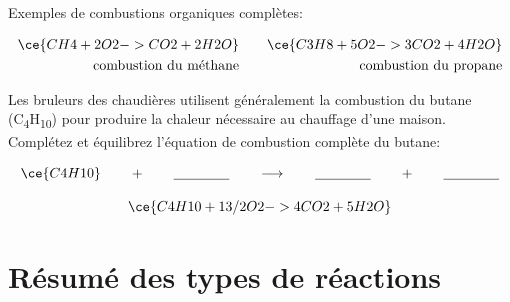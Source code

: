 \documentclass[
  11pt,
  french,
  a4paper,
  openany]{book}
\begin{document}
Exemples de combustions organiques complètes:

\[ \begin{split}
  \ce{CH4 + 2O2 -> CO2 + 2H2O} \\
  \text{combustion du méthane}
  \end{split}
  \qquad
  \begin{split}
  \ce{C3H8 + 5O2 -> 3CO2 + 4H2O} \\
    \text{combustion du propane}
  \end{split} \]

\begin{Exercise}
Les bruleurs des chaudières utilisent généralement la combustion du butane (C\textsubscript{4}H\textsubscript{10}) pour produire la chaleur nécessaire au chauffage d'une maison. Complétez et équilibrez l'équation de combustion complète du butane:

\[ \ce{C4H10} \qquad + \qquad \underline{\qquad\qquad} \qquad \longrightarrow \qquad \underline{\qquad\qquad} \qquad + \qquad \underline{\qquad\qquad} \]

\end{Exercise}

\begin{Answer}
\[ \ce{C4H10 + 13/2O2 -> 4CO2 + 5H2O} \]

\end{Answer}

\hypertarget{ruxe9sumuxe9-des-types-de-ruxe9actions}{%
\section{Résumé des types de réactions}\label{ruxe9sumuxe9-des-types-de-ruxe9actions}}
\end{document}
